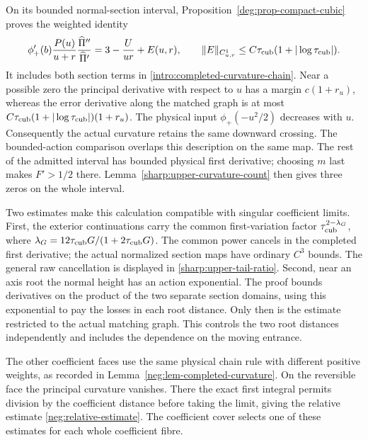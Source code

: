 On its bounded normal-section interval,
Proposition~\ref{deg:prop-compact-cubic} proves the weighted identity
\begin{equation}\label{intro:actual-cubic-curvature}
 \phi_+'(b)\frac{P(u)}{u+r}
              \frac{\widehat\Pi''}{\widehat\Pi'}
 =3-\frac{U}{ur}+E(u,r),\qquad
 \|E\|_{C^1_{u,r}}\le C\tau_{\rm cub}(1+|\log\tau_{\rm cub}|).
\end{equation}
It includes both section terms in
\eqref{intro:completed-curvature-chain}. Near a possible zero the
principal derivative with respect to \(u\) has a margin
\(c(1+r_u)\), whereas the error derivative along the matched graph is
at most \(C\tau_{\rm cub}(1+|\log\tau_{\rm cub}|)(1+r_u)\).
The physical input \(\phi_+(-u^2/2)\) decreases with \(u\).
Consequently the actual curvature retains the same downward crossing.
The bounded-action comparison overlaps this description on the same
map. The rest of the admitted interval has bounded physical first
derivative; choosing \(m\) last makes \(F'>1/2\) there.
Lemma~\ref{sharp:upper-curvature-count} then gives three zeros on the
whole interval.

Two estimates make this calculation compatible with singular
coefficient limits. First, the exterior continuations carry the common
first-variation factor \(\tau_{\rm cub}^{2-\lambda_G}\), where
\(\lambda_G=12\tau_{\rm cub}G/(1+2\tau_{\rm cub}G)\).
The common power cancels in the completed first derivative; the actual
normalized section maps have ordinary \(C^3\) bounds. The general
raw cancellation is displayed in \eqref{sharp:upper-tail-ratio}.
Second, near an axis root the normal height has an action exponential.
The proof bounds derivatives on the product of the two separate section
domains, using this exponential to pay the losses in each root distance.
Only then is the estimate restricted to the actual matching graph.
This controls the two root distances independently and includes the
dependence on the moving entrance.

The other coefficient faces use the same physical chain rule with
different positive weights, as recorded in
Lemma~\ref{neg:lem-completed-curvature}. On the reversible face the
principal curvature vanishes. There the exact first integral permits
division by the coefficient distance before taking the limit, giving
the relative estimate \eqref{neg:relative-estimate}.
The coefficient cover selects one of these estimates for each whole
coefficient fibre.
